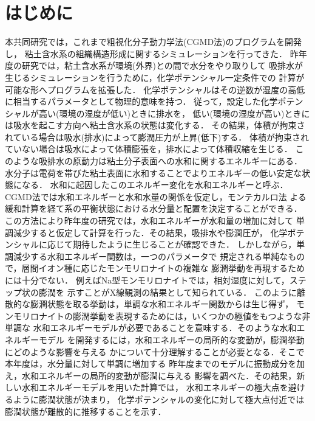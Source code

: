 \section{はじめに}
本共同研究では，これまで粗視化分子動力学法(CGMD法)のプログラムを開発し，
粘土含水系の組織構造形成に関するシミュレーションを行ってきた．
昨年度の研究では，粘土含水系が環境(外界)との間で水分をやり取りして
吸排水が生じるシミュレーションを行うために，化学ポテンシャル一定条件での
計算が可能な形へプログラムを拡張した．
化学ポテンシャルはその逆数が湿度の高低に相当するパラメータとして物理的意味を持つ．
従って，設定した化学ポテンシャルが高い(環境の湿度が低い)ときに排水を，
低い(環境の湿度が高い)ときには吸水を起こす方向へ粘土含水系の状態は変化する．
その結果，体積が拘束されている場合は吸水(排水)によって膨潤圧力が上昇(低下)する．
体積が拘束されていない場合は吸水によって体積膨張を，排水によって体積収縮を生じる．
%
このような吸排水の原動力は粘土分子表面への水和に関するエネルギーにある．
水分子は電荷を帯びた粘土表面に水和することでよりエネルギーの低い安定な状態になる．
水和に起因したこのエネルギー変化を水和エネルギーと呼ぶ．
CGMD法では水和エネルギーと水和水量の関係を仮定し，モンテカルロ法
よる緩和計算を経て系の平衡状態における水分量と配置を決定することができる．
%
この方法により昨年度の研究では，水和エネルギーが水和量の増加に対して
単調減少すると仮定して計算を行った．その結果，吸排水や膨潤圧が，
化学ポテンシャルに応じて期待したように生じることが確認できた．
しかしながら，単調減少する水和エネルギー関数は，一つのパラメータで
規定される単純なもので，層間イオン種に応じたモンモリロナイトの複雑な
膨潤挙動を再現するためには十分でない．
例えばNa型モンモリロナイトでは，相対湿度に対して，ステップ状の膨潤を
示すことがX線観測の結果として知られている．
このように離散的な膨潤状態を取る挙動は，単調な水和エネルギー関数からは生じ得ず，
モンモリロナイトの膨潤挙動を表現するためには，いくつかの極値をもつような非単調な
水和エネルギーモデルが必要であることを意味する．そのような水和エネルギーモデル
を開発するには，水和エネルギーの局所的な変動が，膨潤挙動にどのような影響を与える
かについて十分理解することが必要となる．そこで本年度は，水分量に対して単調に増加する
昨年度までのモデルに振動成分を加え，水和エネルギーの局所的変動が膨潤に与える
影響を調べた．その結果，新しい水和エネルギーモデルを用いた計算では，
水和エネルギーの極大点を避けるように膨潤状態が決まり，
化学ポテンシャルの変化に対して極大点付近では膨潤状態が離散的に推移することを示す．


